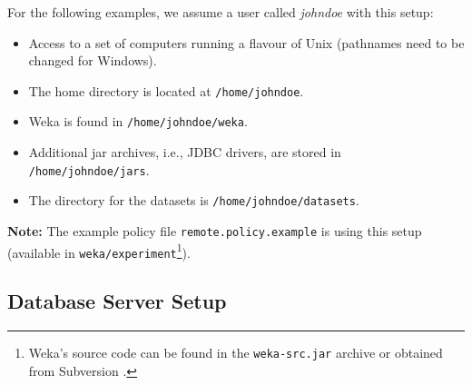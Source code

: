 \noindent For the following examples, we assume a user called \textit{johndoe} with this setup:

\begin{itemize}
	\item Access to a set of computers running a flavour of Unix (pathnames need to be changed for Windows).
   \item The home directory is located at \texttt{/home/johndoe}.
   \item Weka is found in \texttt{/home/johndoe/weka}.
   \item Additional jar archives, i.e., JDBC drivers, are stored in \texttt{/home/johndoe/jars}.
   \item The directory for the datasets is \texttt{/home/johndoe/datasets}.
\end{itemize}

\noindent \textbf{Note:} The example policy file \texttt{remote.policy.example} is using this setup (available in \texttt{weka/experiment}\footnote{Weka's source code can be found in the \texttt{weka-src.jar} archive or obtained from Subversion \cite{subversion}.}).

\subsection{Database Server Setup}

